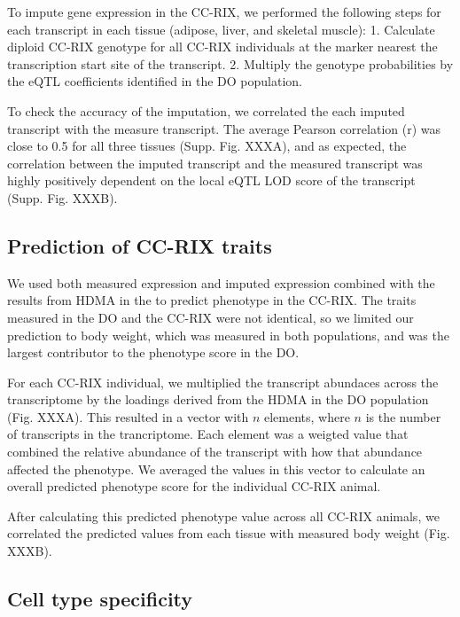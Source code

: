 \documentclass[
]{article}
\begin{document}
To impute gene expression in the CC-RIX, we performed the following
steps for each transcript in each tissue (adipose, liver, and skeletal
muscle): 1. Calculate diploid CC-RIX genotype for all CC-RIX individuals
at the marker nearest the transcription start site of the transcript. 2.
Multiply the genotype probabilities by the eQTL coefficients identified
in the DO population.

To check the accuracy of the imputation, we correlated the each imputed
transcript with the measure transcript. The average Pearson correlation
(r) was close to 0.5 for all three tissues (Supp. Fig. XXXA), and as
expected, the correlation between the imputed transcript and the
measured transcript was highly positively dependent on the local eQTL
LOD score of the transcript (Supp. Fig. XXXB).

\subsection{Prediction of CC-RIX
traits}\label{prediction-of-cc-rix-traits}

We used both measured expression and imputed expression combined with
the results from HDMA in the to predict phenotype in the CC-RIX. The
traits measured in the DO and the CC-RIX were not identical, so we
limited our prediction to body weight, which was measured in both
populations, and was the largest contributor to the phenotype score in
the DO.

For each CC-RIX individual, we multiplied the transcript abundaces
across the transcriptome by the loadings derived from the HDMA in the DO
population (Fig. XXXA). This resulted in a vector with \(n\) elements,
where \(n\) is the number of transcripts in the trancriptome. Each
element was a weigted value that combined the relative abundance of the
transcript with how that abundance affected the phenotype. We averaged
the values in this vector to calculate an overall predicted phenotype
score for the individual CC-RIX animal.

After calculating this predicted phenotype value across all CC-RIX
animals, we correlated the predicted values from each tissue with
measured body weight (Fig. XXXB).

\subsection{Cell type specificity}\label{cell-type-specificity}
\end{document}
